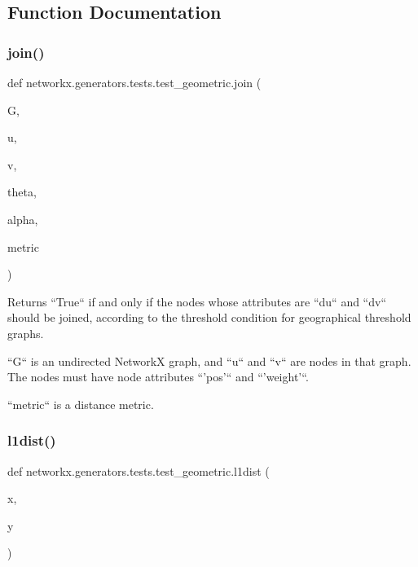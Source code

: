 \subsection{Function Documentation}
\mbox{\label{namespacenetworkx_1_1generators_1_1tests_1_1test__geometric_ad9197c0900f67ef045a5b97872578308}} 
\subsubsection{\texorpdfstring{join()}{join()}}
{\footnotesize\ttfamily def networkx.\+generators.\+tests.\+test\+\_\+geometric.\+join (\begin{DoxyParamCaption}\item[{}]{G,  }\item[{}]{u,  }\item[{}]{v,  }\item[{}]{theta,  }\item[{}]{alpha,  }\item[{}]{metric }\end{DoxyParamCaption})}

\begin{DoxyVerb}Returns ``True`` if and only if the nodes whose attributes are
``du`` and ``dv`` should be joined, according to the threshold
condition for geographical threshold graphs.

``G`` is an undirected NetworkX graph, and ``u`` and ``v`` are nodes
in that graph. The nodes must have node attributes ``'pos'`` and
``'weight'``.

``metric`` is a distance metric.\end{DoxyVerb}
 \mbox{\label{namespacenetworkx_1_1generators_1_1tests_1_1test__geometric_a254be542721af083d80e4982d606776f}} 
\subsubsection{\texorpdfstring{l1dist()}{l1dist()}}
{\footnotesize\ttfamily def networkx.\+generators.\+tests.\+test\+\_\+geometric.\+l1dist (\begin{DoxyParamCaption}\item[{}]{x,  }\item[{}]{y }\end{DoxyParamCaption})}

